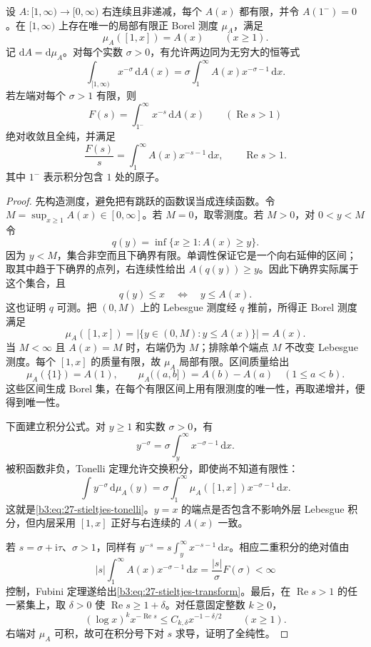 \begin{proposition}
\label{b3:prop:27-stieltjes-transform}
设 \(A:[1,\infty)\to[0,\infty)\) 右连续且非递减，每个 \(A(x)\) 都有限，并令 \(A(1^-)=0\)。在 \([1,\infty)\) 上存在唯一的局部有限正 Borel 测度 \(\mu_A\)，满足
\[
 \mu_A([1,x])=A(x)\qquad(x\ge1).
\]
记 \(\mathrm dA=\mathrm d\mu_A\)。对每个实数 \(\sigma>0\)，有允许两边同为无穷大的恒等式
\begin{equation}
\label{b3:eq:27-stieltjes-tonelli}
 \int_{[1,\infty)}x^{-\sigma}\,\mathrm dA(x)
 =\sigma\int_1^\infty A(x)x^{-\sigma-1}\,\mathrm dx.
\end{equation}
若左端对每个 \(\sigma>1\) 有限，则
\[
 F(s)=\int_{1^-}^\infty x^{-s}\,\mathrm dA(x)
 \qquad(\operatorname{Re}s>1)
\]
绝对收敛且全纯，并满足
\begin{equation}
\label{b3:eq:27-stieltjes-transform}
 \frac{F(s)}s=\int_1^\infty A(x)x^{-s-1}\,\mathrm dx,
 \qquad\operatorname{Re}s>1.
\end{equation}
其中 \(1^-\) 表示积分包含 \(1\) 处的原子。
\end{proposition}
\begin{proof}
先构造测度，避免把有跳跃的函数误当成连续函数。令
\(M=\sup_{x\ge1}A(x)\in[0,\infty]\)。若 \(M=0\)，取零测度。若 \(M>0\)，对 \(0<y<M\) 令
\[
 q(y)=\inf\{x\ge1:A(x)\ge y\}.
\]
因为 \(y<M\)，集合非空而且下确界有限。单调性保证它是一个向右延伸的区间；取其中趋于下确界的点列，右连续性给出 \(A(q(y))\ge y\)。因此下确界实际属于这个集合，且
\[
 q(y)\le x\quad\Longleftrightarrow\quad y\le A(x).
\]
这也证明 \(q\) 可测。把 \((0,M)\) 上的 Lebesgue 测度经 \(q\) 推前，所得正 Borel 测度满足
\[
 \mu_A([1,x])
 =\bigl|\{y\in(0,M):y\le A(x)\}\bigr|=A(x).
\]
当 \(M<\infty\) 且 \(A(x)=M\) 时，右端仍为 \(M\)；排除单个端点 \(M\) 不改变 Lebesgue 测度。每个 \([1,x]\) 的质量有限，故 \(\mu_A\) 局部有限。区间质量给出
\[
 \mu_A(\{1\})=A(1),\qquad
 \mu_A((a,b])=A(b)-A(a)\quad(1\le a<b).
\]
这些区间生成 Borel 集，在每个有限区间上用有限测度的唯一性，再取递增并，便得到唯一性。

下面建立积分公式。对 \(y\ge1\) 和实数 \(\sigma>0\)，有
\[
 y^{-\sigma}=\sigma\int_y^\infty x^{-\sigma-1}\,\mathrm dx.
\]
被积函数非负，Tonelli 定理允许交换积分，即使尚不知道有限性：
\[
 \int y^{-\sigma}\,\mathrm d\mu_A(y)
 =\sigma\int_1^\infty
    \mu_A([1,x])x^{-\sigma-1}\,\mathrm dx.
\]
这就是\eqref{b3:eq:27-stieltjes-tonelli}。\(y=x\) 的端点是否包含不影响外层 Lebesgue 积分，但内层采用 \([1,x]\) 正好与右连续的 \(A(x)\) 一致。

若 \(s=\sigma+\mathrm i\tau\)、\(\sigma>1\)，同样有
\(y^{-s}=s\int_y^\infty x^{-s-1}\,\mathrm dx\)。相应二重积分的绝对值由
\[
 |s|\int_1^\infty A(x)x^{-\sigma-1}\,\mathrm dx
 =\frac{|s|}{\sigma}F(\sigma)<\infty
\]
控制，Fubini 定理遂给出\eqref{b3:eq:27-stieltjes-transform}。最后，在 \(\operatorname{Re}s>1\) 的任一紧集上，取 \(\delta>0\) 使 \(\operatorname{Re}s\ge1+\delta\)。对任意固定整数 \(k\ge0\)，
\[
 (\log x)^k x^{-\operatorname{Re}s}
 \le C_{k,\delta}x^{-1-\delta/2}\qquad(x\ge1).
\]
右端对 \(\mu_A\) 可积，故可在积分号下对 \(s\) 求导，证明了全纯性。
\end{proof}

